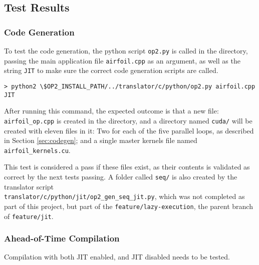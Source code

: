 \subsection{Test Results}

\subsubsection{Code Generation}
To test the code generation, the python script \verb|op2.py| is called in the directory, passing the main application file \verb|airfoil.cpp| as an argument, as well as the string \verb|JIT| to make sure the correct code generation scripts are called.
\begin{verbatim}
> python2 \$OP2_INSTALL_PATH/../translator/c/python/op2.py airfoil.cpp JIT
\end{verbatim}
After running this command, the expected outcome is that a new file: \verb|airfoil_op.cpp| is created in the directory, and a directory named \verb|cuda/| will be created with eleven files in it: Two for each of the five parallel loops, as described in Section \ref{sec:codegen}; and a single master kernels file named \verb|airfoil_kernels.cu|.
\par
This test is considered a pass if these files exist, as their contents is validated as correct by the next tests passing. A folder called \verb|seq/| is also created by the translator script\\
 \verb|translator/c/python/jit/op2_gen_seq_jit.py|, which was not completed as part of this project, but part of the \verb|feature/lazy-execution|, the parent branch of \verb|feature/jit|.


\subsubsection{Ahead-of-Time Compilation}
Compilation with both JIT enabled, and JIT disabled needs to be tested.

